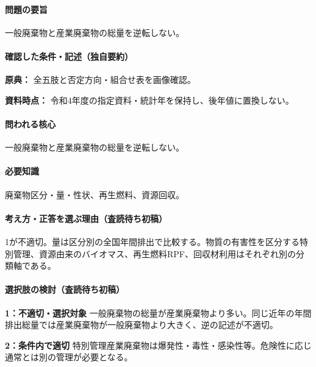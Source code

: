 \paragraph{問題の要旨} 一般廃棄物と産業廃棄物の総量を逆転しない。

\paragraph{確認した条件・記述（独自要約）}\mbox{}\par

\noindent\textbf{原典：} 全五肢と否定方向・組合せ表を画像確認。\par

\noindent\textbf{資料時点：} 令和4年度の指定資料・統計年を保持し、後年値に置換しない。\par

\paragraph{問われる核心} 一般廃棄物と産業廃棄物の総量を逆転しない。

\paragraph{必要知識} 廃棄物区分・量・性状、再生燃料、資源回収。

\paragraph{考え方・正答を選ぶ理由（査読待ち初稿）} 1が不適切。量は区分別の全国年間排出で比較する。物質の有害性を区分する特別管理、資源由来のバイオマス、再生燃料RPF、回収材利用はそれぞれ別の分類軸である。

\paragraph{選択肢の検討（査読待ち初稿）}\mbox{}\par

\noindent\textbf{1：不適切・選択対象} 一般廃棄物の総量が産業廃棄物より多い。同じ近年の年間排出総量では産業廃棄物が一般廃棄物より大きく、逆の記述が不適切。\par

\noindent\textbf{2：条件内で適切} 特別管理産業廃棄物は爆発性・毒性・感染性等。危険性に応じ通常とは別の管理が必要となる。\par

